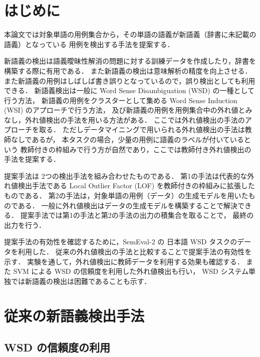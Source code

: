 \documentclass[japanese]{jnlp_1.4}
\begin{document}
\maketitle


\section{はじめに}

本論文では対象単語の用例集合から，その単語の語義が新語義（辞書に未記載の語義）となっている
用例を検出する手法を提案する．

新語義の検出は語義曖昧性解消の問題に対する訓練データを作成したり，辞書を構築する際に有用である．
また新語義の検出は意味解析の精度を向上させる\cite{erk}．
また新語義の用例はしばしば書き誤りとなっているので，誤り検出としても利用できる．
新語義検出は一般に Word Sense Disambiguation (WSD) の一種として行う方法，
新語義の用例をクラスターとして集める Word Sense Induction (WSI) のアプローチで行う方法\cite{denkowski}，
及び新語義の用例を用例集合中の外れ値とみなし，外れ値検出の手法を用いる方法\cite{erk}がある．
ここでは外れ値検出の手法のアプローチを取る．
ただしデータマイニングで用いられる外れ値検出の手法は教師なしであるが，
本タスクの場合，少量の用例に語義のラベルが付いているという
教師付きの枠組みで行う方が自然であり，ここでは教師付き外れ値検出の手法を提案する．

提案手法は 2つの検出手法を組み合わせたものである．
第1の手法は代表的な外れ値検出手法である
Local Outlier Factor (LOF) \cite{lof} を教師付きの枠組みに拡張したものである．
第2の手法は，対象単語の用例（データ）の生成モデルを用いたものである．
一般に外れ値検出はデータの生成モデルを構築することで解決できる．
提案手法では第1の手法と第2の手法の出力の積集合を取ることで，
最終の出力を行う．

提案手法の有効性を確認するために，SemEval-2 の 日本語 WSD タスク\cite{semeval-2010}のデータを利用した．
従来の外れ値検出の手法と比較することで提案手法の有効性を示す．
実験を通して，外れ値検出に教師データを利用する効果も確認する．
また SVM による WSD の信頼度を利用した外れ値検出も行い，
WSD システム単独では新語義の検出は困難であることも示す．


\section{従来の新語義検出手法}

\subsection{WSD の信頼度の利用}
\end{document}

